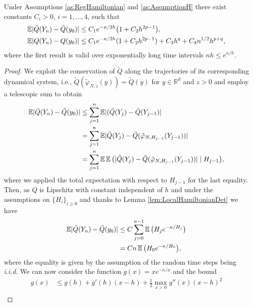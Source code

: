 \documentclass{siamart1116}
\numberwithin{theorem}{section}
\DeclarePairedDelimiter{\abs}{\lvert}{\rvert}
\renewcommand{\phi}{\varphi}
\newcommand{\R}{\mathbb{R}}
\newcommand{\E}{\operatorname{\mathbb{E}}}
\begin{document}
\begin{theorem}\label{thm:RTSHamiltonian} Under Assumptions \ref{as:RegHamiltonian} and \ref{as:AssumptionH} there exist constants $C_i > 0$, $i = 1, \ldots, 4$, such that
	\begin{align}
		\E \abs{\tilde Q(Y_n) - \tilde Q(y_0)} &\leq C_1 e^{-\kappa/2h}\big(1 + C_2 h^{2p-1}\big), \\
		\E \abs{Q(Y_n) - Q(y_0)} &\leq C_1 e^{-\kappa/2h}(1 + C_2 h^{2p-1}) + C_3 h^q + C_4 n^{1/2} h^{p+q}, \label{eq:ErrorHamiltonian}
	\end{align}
	where the first result is valid over exponentially long time intervals $nh \leq e^{\kappa / h}$.
\end{theorem}
\begin{proof} We exploit the conservation of $\tilde Q$ along the trajectories of its corresponding dynamical system, i.e., $\tilde Q (\tilde \phi_{N,z} (y)) = \tilde Q(y)$ for $y \in \R^d$ and $z > 0$ and employ a telescopic sum to obtain
\begin{equation}
\begin{aligned}
	\E \abs{\tilde Q(Y_n) - \tilde Q(y_0)} &\leq \sum_{j=1}^{n} \E\abs{(\tilde Q(Y_{j}) - \tilde Q(Y_{j-1})} \\
	&= \sum_{j=1}^{n} \E \abs{\tilde Q(Y_j) - \tilde Q(\tilde\phi_{N, H_{j-1}}(Y_{j-1}))} \\
	&= \sum_{j=1}^{n} \E\E\big(\abs{\tilde Q(Y_j) - \tilde Q (\tilde\phi_{N, H_{j-1}}(Y_{j-1}))} \mid H_{j-1}\big),
\end{aligned}
\end{equation}
where we applied the total expectation with respect to $H_{j-1}$ for the last equality. Then, as $Q$ is Lipschitz with constant independent of $h$ and under the assumptions on $\{H_i\}_{i\geq 0}$ and thanks to Lemma \ref{lem:LocalHamiltonianDet} we have
\begin{equation}
\begin{aligned}
\E \abs{\tilde Q(Y_n) - \tilde Q(y_0)} &\leq C \sum_{j=0}^{n-1} \E\big(H_{j}e^{-\kappa/H_j}\big)\\
&= C n \E\big(H_0e^{-\kappa/H_0}\big),
\end{aligned}
\end{equation}
where the equality is given by the assumption of the random time steps being \textit{i.i.d.} We can now consider the function $g(x) = xe^{-\kappa/x}$ and the bound
\begin{equation}
\begin{aligned}
	g(x) &\leq g(h) + g'(h) (x - h) + \frac{1}{2} \max_{x>0} g''(x) (x - h)^2 \\

\end{aligned}
\end{equation}
\end{proof}
\end{document}
